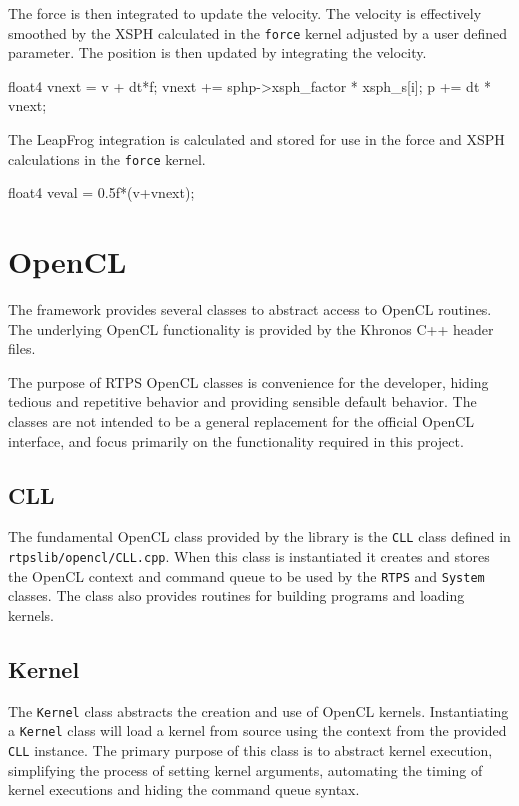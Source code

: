 The force is then integrated to update the velocity. The velocity is
effectively smoothed by the XSPH calculated in the \verb|force| kernel adjusted
by a user defined parameter. The position is then updated by integrating the
velocity.
\begin{cppcode}{0}
float4 vnext = v + dt*f;
vnext += sphp->xsph_factor * xsph_s[i];
p += dt * vnext;
\end{cppcode}

The LeapFrog integration is calculated and stored for use in the force and XSPH
calculations in the \verb|force| kernel.
\begin{cppcode}{0}
float4 veval = 0.5f*(v+vnext);
\end{cppcode}




\section{OpenCL}

The framework provides several classes to abstract access to OpenCL routines.
The underlying OpenCL functionality is provided by the Khronos C++ header
files.\cite{OpenCL} 

The purpose of RTPS OpenCL classes is convenience for the developer, hiding tedious
and repetitive behavior and providing sensible default behavior. The classes
are not intended to be a general replacement for the official OpenCL interface,
and focus primarily on the functionality required in this project.

\subsection{CLL}
The fundamental OpenCL class provided by the library is the \verb|CLL| class
defined in \verb|rtpslib/opencl/CLL.cpp|. When this class is instantiated it
creates and stores the OpenCL context and command queue to be used by the
\verb|RTPS| and \verb|System| classes. The class also provides routines for
building programs and loading kernels.

\subsection{Kernel}
The \verb|Kernel| class abstracts the creation and use of OpenCL kernels.
Instantiating a \verb|Kernel| class will load a kernel from source using the
context from the provided \verb|CLL| instance. The primary purpose of this
class is to abstract kernel execution, simplifying the process of setting
kernel arguments, automating the timing of kernel executions and hiding the
command queue syntax.


